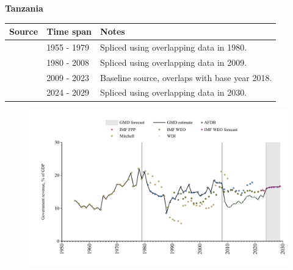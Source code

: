 \documentclass[12pt,a4paper,landscape]{article}
\begin{document}
\begin{adjustbox}{max totalsize={\paperwidth}{\paperheight},center}
\begin{minipage}[t][\textheight][t]{\textwidth}
\vspace*{0.5cm}
{}
\begin{center}
{\Large\bfseries Tanzania}
\end{center}
\vspace{0.5cm}
\begin{table}[H]
\centering
\small
\begin{tabular}{|l|l|l|}
\hline
\textbf{Source} & \textbf{Time span} & \textbf{Notes} \\
\hline
\rowcolor{white}\cite{Mitchell}& 1955 - 1979 &Spliced using overlapping data in 1980.\\
\rowcolor{lightgray}\cite{AFDB}& 1980 - 2008 &Spliced using overlapping data in 2009.\\
\rowcolor{white}\cite{WDI}& 2009 - 2023 &Baseline source, overlaps with base year 2018.\\
\rowcolor{lightgray}\cite{IMF_WEO_forecast}& 2024 - 2029 &Spliced using overlapping data in 2030.\\
\hline
\end{tabular}
\end{table}
\begin{figure}[H]
\centering
\includegraphics[width=\textwidth,height=0.6\textheight,keepaspectratio]{graphs/TZA_govrev_GDP.pdf}
\end{figure}
\end{minipage}
\end{adjustbox}
\end{document}
